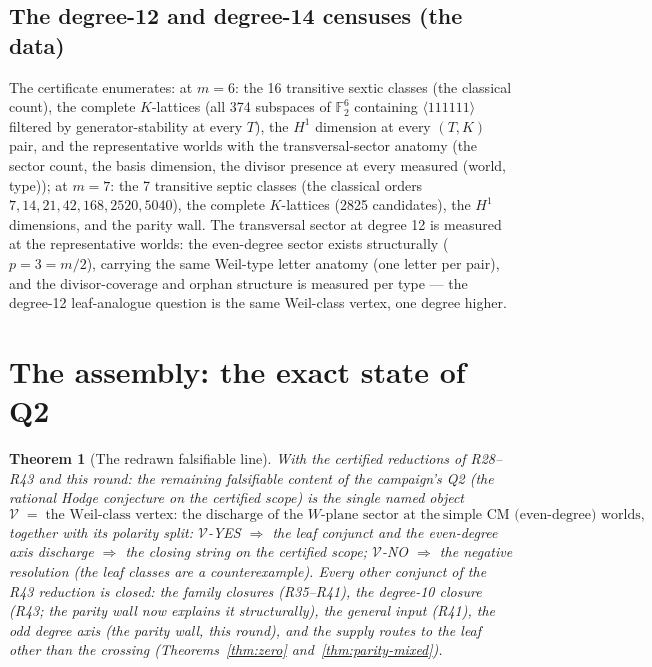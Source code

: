 \documentclass[11pt]{article}
\newtheorem{theorem}{Theorem}
\begin{document}
\subsection{The degree-12 and degree-14 censuses (the data)}

The certificate enumerates: at $m = 6$: the 16 transitive sextic classes (the classical count),
the complete $K$-lattices (all 374 subspaces of $\mathbb{F}_2^6$ containing $\langle
111111\rangle$ filtered by generator-stability at every $T$), the $H^1$ dimension at every
$(T, K)$ pair, and the representative worlds with the transversal-sector anatomy (the sector
count, the basis dimension, the divisor presence at every measured (world, type)); at $m = 7$:
the 7 transitive septic classes (the classical orders $7, 14, 21, 42, 168, 2520, 5040$), the
complete $K$-lattices (2825 candidates), the $H^1$ dimensions, and the parity wall.  The
transversal sector at degree 12 is measured at the representative worlds: the even-degree
sector exists structurally ($p = 3 = m/2$), carrying the same Weil-type letter anatomy
(one letter per pair), and the divisor-coverage and orphan structure is measured per type ---
the degree-12 leaf-analogue question is the same Weil-class vertex, one degree higher.

\section{The assembly: the exact state of Q2}

\begin{theorem}[The redrawn falsifiable line]\label{thm:assembly}
With the certified reductions of R28--R43 and this round: the remaining falsifiable content of
the campaign's Q2 (the rational Hodge conjecture on the certified scope) is the single named
object
\[
\mathcal{V} \;=\; \text{the Weil-class vertex: the discharge of the } W\text{-plane sector at the}
\ \text{simple CM (even-degree) worlds},
\]
together with its polarity split: $\mathcal{V}$-YES $\Rightarrow$ the leaf conjunct and the
even-degree axis discharge $\Rightarrow$ the closing string on the certified scope;
$\mathcal{V}$-NO $\Rightarrow$ the negative resolution (the leaf classes are a counterexample).
Every other conjunct of the R43 reduction is closed: the family closures (R35--R41), the
degree-10 closure (R43; the parity wall now explains it structurally), the general input
(R41), the odd degree axis (the parity wall, this round), and the supply routes to the leaf
other than the crossing (Theorems~\ref{thm:zero} and~\ref{thm:parity-mixed}).
\end{theorem}
\end{document}
